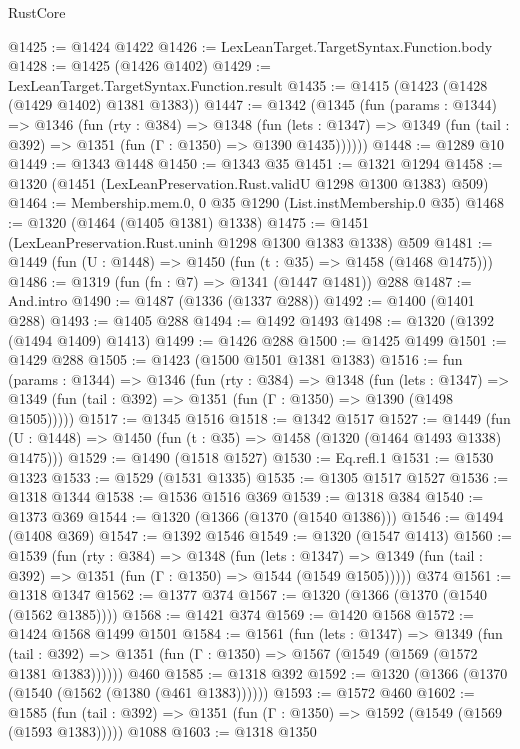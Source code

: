 \begin{lexlean}{RustCore}
\begin{coremodule}
@1425 := @1424 @1422
@1426 := LexLeanTarget.TargetSyntax.Function.body
@1428 := @1425 (@1426 @1402)
@1429 := LexLeanTarget.TargetSyntax.Function.result
@1435 := @1415 (@1423 (@1428 (@1429 @1402) @1381 @1383))
@1447 := @1342
    (@1345
      (fun (params : @1344) =>
      @1346
        (fun (rty : @384) =>
        @1348
          (fun (lets : @1347) =>
          @1349 (fun (tail : @392) => @1351 (fun (Γ : @1350) => @1390 @1435))))))
@1448 := @1289 @10
@1449 := @1343 @1448
@1450 := @1343 @35
@1451 := @1321 @1294
@1458 := @1320 (@1451 (LexLeanPreservation.Rust.validU @1298 @1300 @1383) @509)
@1464 := Membership.mem.{0, 0} @35 @1290 (List.instMembership.{0} @35)
@1468 := @1320 (@1464 (@1405 @1381) @1338)
@1475 := @1451 (LexLeanPreservation.Rust.uninh @1298 @1300 @1383 @1338) @509
@1481 := @1449 (fun (U : @1448) => @1450 (fun (t : @35) => @1458 (@1468 @1475)))
@1486 := @1319 (fun (fn : @7) => @1341 (@1447 @1481)) @288
@1487 := And.intro
@1490 := @1487 (@1336 (@1337 @288))
@1492 := @1400 (@1401 @288)
@1493 := @1405 @288
@1494 := @1492 @1493
@1498 := @1320 (@1392 (@1494 @1409) @1413)
@1499 := @1426 @288
@1500 := @1425 @1499
@1501 := @1429 @288
@1505 := @1423 (@1500 @1501 @1381 @1383)
@1516 := fun (params : @1344) =>
  @1346
    (fun (rty : @384) =>
    @1348
      (fun (lets : @1347) =>
      @1349 (fun (tail : @392) => @1351 (fun (Γ : @1350) => @1390 (@1498 @1505)))))
@1517 := @1345 @1516
@1518 := @1342 @1517
@1527 := @1449 (fun (U : @1448) => @1450 (fun (t : @35) => @1458 (@1320 (@1464 @1493 @1338) @1475)))
@1529 := @1490 (@1518 @1527)
@1530 := Eq.refl.{1}
@1531 := @1530 @1323
@1533 := @1529 (@1531 @1335)
@1535 := @1305 @1517 @1527
@1536 := @1318 @1344
@1538 := @1536 @1516 @369
@1539 := @1318 @384
@1540 := @1373 @369
@1544 := @1320 (@1366 (@1370 (@1540 @1386)))
@1546 := @1494 (@1408 @369)
@1547 := @1392 @1546
@1549 := @1320 (@1547 @1413)
@1560 := @1539
    (fun (rty : @384) =>
    @1348
      (fun (lets : @1347) =>
      @1349 (fun (tail : @392) => @1351 (fun (Γ : @1350) => @1544 (@1549 @1505)))))
    @374
@1561 := @1318 @1347
@1562 := @1377 @374
@1567 := @1320 (@1366 (@1370 (@1540 (@1562 @1385))))
@1568 := @1421 @374
@1569 := @1420 @1568
@1572 := @1424 @1568 @1499 @1501
@1584 := @1561
    (fun (lets : @1347) =>
    @1349
      (fun (tail : @392) => @1351 (fun (Γ : @1350) => @1567 (@1549 (@1569 (@1572 @1381 @1383))))))
    @460
@1585 := @1318 @392
@1592 := @1320 (@1366 (@1370 (@1540 (@1562 (@1380 (@461 @1383))))))
@1593 := @1572 @460
@1602 := @1585
    (fun (tail : @392) => @1351 (fun (Γ : @1350) => @1592 (@1549 (@1569 (@1593 @1383)))))
    @1088
@1603 := @1318 @1350

\end{coremodule}
\end{lexlean}
